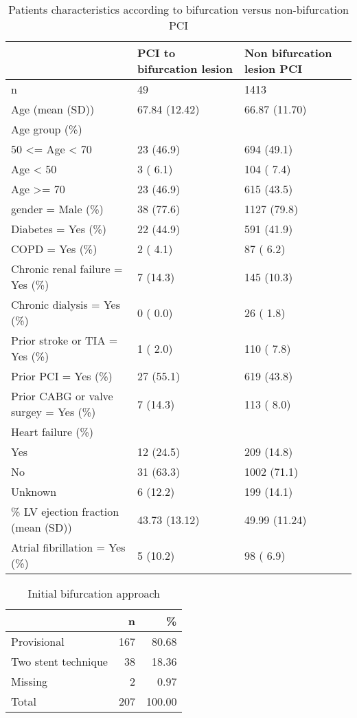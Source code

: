 \documentclass[
]{article}
\begin{document}
\begin{longtable}[t]{lll}
\caption{\label{tab:table 38}Patients characteristics according to bifurcation versus non-bifurcation PCI}\\
\toprule
 & PCI to bifurcation lesion & Non bifurcation lesion PCI\\
\midrule
n & 49 & 1413\\
Age (mean (SD)) & 67.84 (12.42) & 66.87 (11.70)\\
Age group (\%) &  & \\
\hspace{1em}50 <= Age < 70 & 23 (46.9) & 694 (49.1)\\
\hspace{1em}Age < 50 & 3 ( 6.1) & 104 ( 7.4)\\
\addlinespace
\hspace{1em}Age >= 70 & 23 (46.9) & 615 (43.5)\\
gender = Male (\%) & 38 (77.6) & 1127 (79.8)\\
Diabetes = Yes (\%) & 22 (44.9) & 591 (41.9)\\
COPD = Yes (\%) & 2 ( 4.1) & 87 ( 6.2)\\
Chronic renal failure = Yes (\%) & 7 (14.3) & 145 (10.3)\\
\addlinespace
Chronic dialysis = Yes (\%) & 0 ( 0.0) & 26 ( 1.8)\\
Prior stroke or TIA = Yes (\%) & 1 ( 2.0) & 110 ( 7.8)\\
Prior PCI = Yes (\%) & 27 (55.1) & 619 (43.8)\\
Prior CABG or valve surgey = Yes (\%) & 7 (14.3) & 113 ( 8.0)\\
Heart failure (\%) &  & \\
\addlinespace
\hspace{1em}Yes & 12 (24.5) & 209 (14.8)\\
\hspace{1em}No & 31 (63.3) & 1002 (71.1)\\
\hspace{1em}Unknown & 6 (12.2) & 199 (14.1)\\
\% LV ejection fraction (mean (SD)) & 43.73 (13.12) & 49.99 (11.24)\\
Atrial fibrillation = Yes (\%) & 5 (10.2) & 98 ( 6.9)\\
\bottomrule
\end{longtable}

\begin{longtable}[t]{lrr}
\caption{\label{tab:table 39}Initial bifurcation approach}\\
\toprule
 & n & \%\\
\midrule
Provisional & 167 & 80.68\\
Two stent technique & 38 & 18.36\\
Missing & 2 & 0.97\\
Total & 207 & 100.00\\
\bottomrule
\end{longtable}
\end{document}
